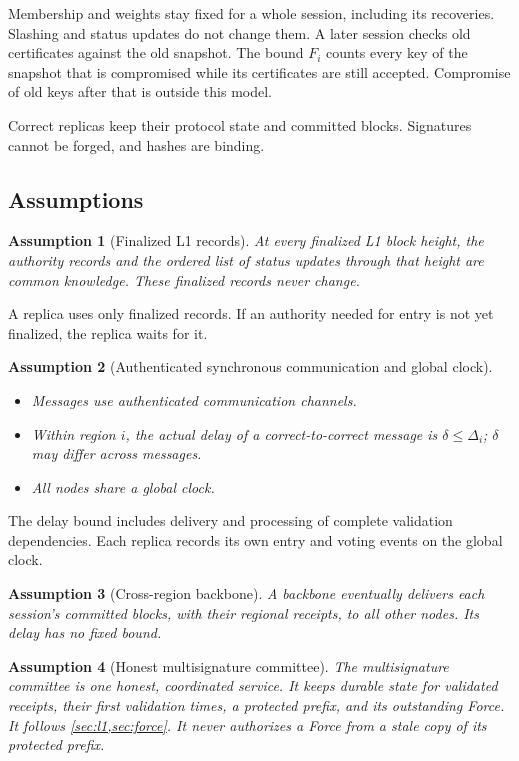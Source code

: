 \documentclass[11pt,a4paper]{article}
\newtheorem{assumption}[assumption]{Assumption}
\newcounter{protocol}
\begin{document}
Membership and weights stay fixed for a whole session, including its
recoveries. Slashing and status updates do not change them. A later
session checks old certificates against the old snapshot. The bound
$F_i$ counts every key of the snapshot that is compromised while its
certificates are still accepted. Compromise of old keys after that is
outside this model.

Correct replicas keep their protocol state and committed blocks.
Signatures cannot be forged, and hashes are binding.

\subsection{Assumptions}
\label{sec:assumptions}
\begin{assumption}[Finalized L1 records]
\label{ass:authority}
At every finalized L1 block height, the authority records and the ordered
list of status updates through that height are common knowledge. These
finalized records never change.
\end{assumption}
A replica uses only finalized records. If an authority needed for entry
is not yet finalized, the replica waits for it.

\begin{assumption}[Authenticated synchronous communication and global clock]
\label{ass:network}
\leavevmode\par
\begin{itemize}
\item Messages use authenticated communication channels.
\item Within region $i$, the actual delay of a correct-to-correct
message is $\delta\le\Delta_i$; $\delta$ may differ across messages.
\item All nodes share a global clock.
\end{itemize}
\end{assumption}
The delay bound includes delivery and processing of complete validation
dependencies. Each replica records its own entry and voting events on
the global clock.

\begin{assumption}[Cross-region backbone]
\label{ass:backbone}
A backbone eventually delivers each session's committed blocks, with
their regional receipts, to all other nodes. Its delay has no fixed
bound.
\end{assumption}

\begin{assumption}[Honest multisignature committee]
\label{ass:committee}
The multisignature committee is one honest, coordinated service. It
keeps durable state for validated receipts, their first validation times,
a protected prefix, and its outstanding Force. It follows
\cref{sec:l1,sec:force}. It never authorizes a Force from a stale copy
of its protected prefix.
\end{assumption}
\end{document}
